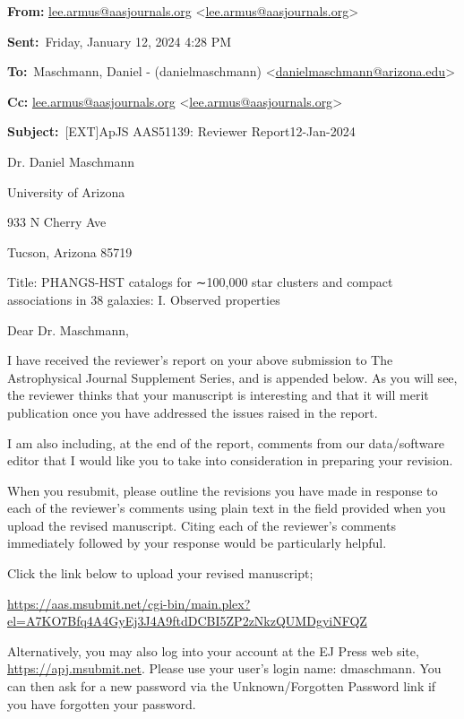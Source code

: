 \textbf{From:} \href{mailto:lee.armus@aasjournals.org}{lee.armus@aasjournals.org} <\href{mailto:lee.armus@aasjournals.org}{lee.armus@aasjournals.org}>

\textbf{Sent:} Friday, January 12, 2024 4:28 PM

\textbf{To:} Maschmann, Daniel - (danielmaschmann) <\href{mailto:danielmaschmann@arizona.edu}{danielmaschmann@arizona.edu}>

\textbf{Cc:} \href{mailto:lee.armus@aasjournals.org}{lee.armus@aasjournals.org} <\href{mailto:lee.armus@aasjournals.org}{lee.armus@aasjournals.org}>

\textbf{Subject:} [EXT]ApJS AAS51139: Reviewer Report12-Jan-2024

Dr. Daniel Maschmann

University of Arizona

933 N Cherry Ave

Tucson, Arizona 85719

Title: PHANGS-HST catalogs for ∼100,000 star clusters and compact associations in 38 galaxies: I. Observed properties

Dear Dr. Maschmann,

I have received the reviewer's report on your above submission to The Astrophysical Journal Supplement Series, and is appended below. As you will see, the reviewer thinks that your manuscript is interesting and that it will merit publication once you have addressed the issues raised in the report.

I am also including, at the end of the report, comments from our data/software editor that I would like you to take into consideration in preparing your revision.

When you resubmit, please outline the revisions you have made in response to each of the reviewer's comments using plain text in the field provided when you upload the revised manuscript. Citing each of the reviewer's comments immediately followed by your response would be particularly helpful.

Click the link below to upload your revised manuscript;

\href{https://urldefense.com/v3/__https://aas.msubmit.net/cgi-bin/main.plex?el=A7KO7Bfq4A4GyEj3J4A9ftdDCBI5ZP2zNkzQUMDgyiNFQZ__;!!CrWY41Z8OgsX0i-WU-0LuAcUu2o!x0H9flwG8xf6vpsrzrS__qjOD78S-nTxDs3LeFsBHvpsdMh0v7uanWu3OzPlbAsGTBfHkJ4MEt7RSFFpEg-312W8n-Mp$}{https://aas.msubmit.net/cgi-bin/main.plex?el=A7KO7Bfq4A4GyEj3J4A9ftdDCBI5ZP2zNkzQUMDgyiNFQZ}

Alternatively, you may also log into your account at the EJ Press web site, \href{https://urldefense.com/v3/__https://apj.msubmit.net__;!!CrWY41Z8OgsX0i-WU-0LuAcUu2o!x0H9flwG8xf6vpsrzrS__qjOD78S-nTxDs3LeFsBHvpsdMh0v7uanWu3OzPlbAsGTBfHkJ4MEt7RSFFpEg-31yeIT13M$}{https://apj.msubmit.net}. Please use your user's login name: dmaschmann. You can then ask for a new password via the Unknown/Forgotten Password link if you have forgotten your password.

